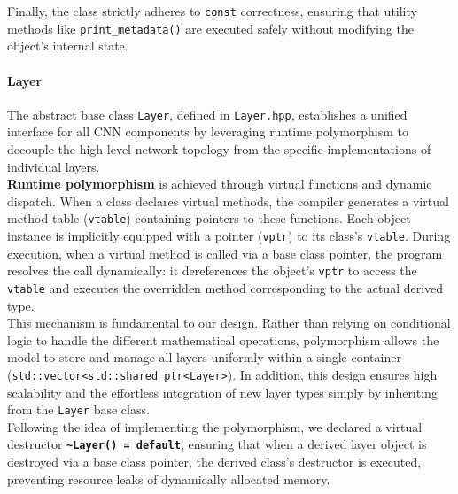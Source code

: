 Finally, the class strictly adheres to \texttt{const} correctness, ensuring that utility methods like \texttt{print\_metadata()} are executed safely without modifying the object's internal state.

\paragraph{Layer}

The abstract base class \texttt{Layer}, defined in \texttt{Layer.hpp}, establishes a unified interface for all CNN components by leveraging runtime polymorphism to decouple the high-level network topology from the specific implementations of individual layers.\\

\textbf{Runtime polymorphism} is achieved through virtual functions and dynamic dispatch. When a class declares virtual methods, the compiler generates a virtual method table (\texttt{vtable}) containing pointers to these functions. Each object instance is implicitly equipped with a pointer (\texttt{vptr}) to its class's \texttt{vtable}. During execution, when a virtual method is called via a base class pointer, the program resolves the call dynamically: it dereferences the object's \texttt{vptr} to access the \texttt{vtable} and executes the overridden method corresponding to the actual derived type.\\

This mechanism is fundamental to our design. Rather than relying on conditional logic to handle the different mathematical operations, polymorphism allows the model to store and manage all layers uniformly within a single container (\texttt{std::vector<std::shared\_ptr<Layer>}). In addition, this design ensures high scalability and the effortless integration of new layer types simply by inheriting from the \texttt{Layer} base class.\\

Following the idea of implementing the polymorphism, we declared a virtual destructor \textbf{\texttt{\textasciitilde Layer() = default}}, ensuring that when a derived layer object is destroyed via a base class pointer, the derived class's destructor is executed, preventing resource leaks of dynamically allocated memory.\\

